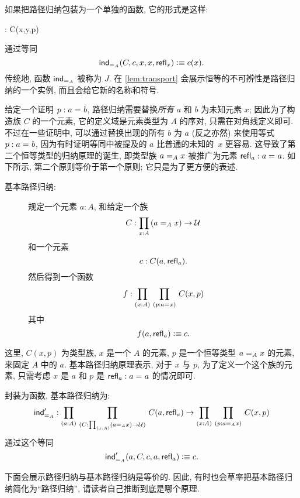 如果把路径归纳包装为一个单独的函数, 它的形式是这样:
%
\begin{narrowmultline*}
     : 
     \to
    \narrowbreak
     C(x,y,p)
\end{narrowmultline*}
通过等同 \[ \indid{A}(C,c,x,x,\refl{x}) \defeq c(x). \]
传统地, 函数 $ \indid{A}$ 被称为 $J$.
%
在 \cref{lem:transport} 会展示恒等的不可辨性是路径归纳的一个实例, 而且会给它新的名称和符号.

\mentalpause

给定一个证明 $p : \id{a}{b}$, 路径归纳需要替换\emph{所有} $a$ 和 $b$ 为未知元素 $x$;
因此为了构造族 $C$ 的一个元素, 它的定义域是元素类型为 $A$ 的序对, 只需在对角线定义即可.
不过在一些证明中, 可以通过替换出现的所有 $b$ 为 $a$ (反之亦然) 来使用等式 $p : \id{a}{b}$, 因为有时证明等同中被提及的 $a$ 比普通的未知的~$x$ 更容易.
这导致了第二个恒等类型的归纳原理的诞生, 即类型族 $\id[A]{a}{x}$ 被推广为元素 $\refl{a} : \id{a}{a}$.
如下所示, 第二个原则等价于第一个原则;
它只是为了更方便的表述.

%
%
\begin{description}
    \item[基本路径归纳:]
    规定一个元素 $a:A$, 和给定一个族
    \[ C : \prd{x:A} (\id[A]{a}{x}) \to \UU \]
    和一个元素
    \[ c : C(a,\refl{a}). \]
    然后得到一个函数
    \[ f : \prd{x:A}{p:\id{a}{x}} C(x,p) \]
    其中
    \[ f(a,\refl{a}) \defeq c.\]
\end{description}

这里, $C(x,p)$ 为类型族, $x$ 是一个 $A$ 的元素, $p$ 是一个恒等类型 $\id[A]{a}{x}$ 的元素, 来固定 $A$ 中的 $a$.
基本路径归纳原理表示, 对于 $x$ 与 $p$, 为了定义一个这个族的元素, 只需考虑 $x$ 是 $a$ 和 $p$ 是 $\refl{a} : \id{a}{a}$ 的情况即可.

封装为函数, 基本路径归纳为:
%
\begin{align*}
    \indidb{A} : \dprd{a:A}{C : \prd{x:A} (\id[A]{a}{x}) \to \UU}
    C(a,\refl{a}) \to \dprd{x:A}{p : \id[A]{a}{x}} C(x,p)
\end{align*}
通过这个等同 \[ \indidb{A}(a,C,c,a,\refl{a}) \defeq c. \]

下面会展示路径归纳与基本路径归纳是等价的.
因此, 有时也会草率把基本路径归纳简化为``路径归纳'', 请读者自己推断到底是哪个原理.

